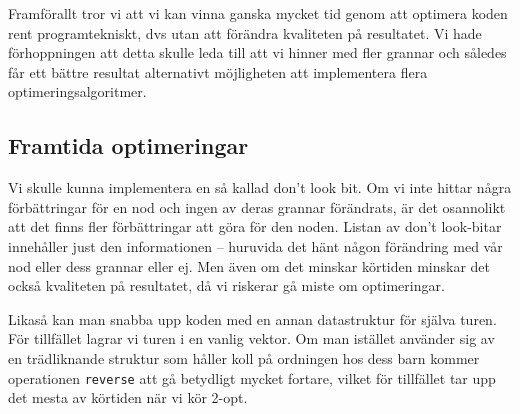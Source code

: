 \documentclass[a4paper,12pt]{article}
\renewcommand{\*}{\ensuremath{\cdot}}
\begin{document}
Framförallt tror vi att vi kan vinna ganska mycket tid genom att optimera koden rent programtekniskt, dvs utan att förändra kvaliteten på resultatet. Vi hade förhoppningen att detta skulle leda till att vi hinner med fler grannar och således får ett bättre resultat alternativt möjligheten att implementera flera optimeringsalgoritmer.

\subsection{Framtida optimeringar} 

Vi skulle kunna implementera en så kallad don't look bit. Om vi inte hittar
några förbättringar för en nod och ingen av deras grannar förändrats, är det
osannolikt att det finns fler förbättringar att göra för den noden. Listan av
don't look-bitar innehåller just den informationen -- huruvida det hänt någon
förändring med vår nod eller dess grannar eller ej. Men även om det minskar
körtiden minskar det också kvaliteten på resultatet, då vi riskerar gå miste om
optimeringar.

Likaså kan man snabba upp koden med en annan datastruktur för själva turen. För
tillfället lagrar vi turen i en vanlig vektor. Om man istället använder sig av
en trädliknande struktur som håller koll på ordningen hos dess barn kommer
operationen \texttt{reverse} att gå betydligt mycket fortare, vilket för
tillfället tar upp det mesta av körtiden när vi kör 2-opt.
\end{document}

